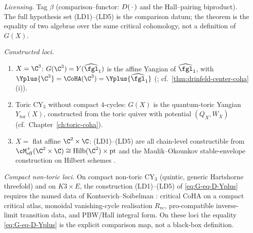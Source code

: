 \begin{theorem}
\emph{Licensing.} Tag $\beta$ \textup{(}comparison--functor:
$D(\,\cdot\,)$ and the Hall--pairing biproduct\textup{)}.
The full hypothesis set \textup{(LD1)--(LD5)} is the comparison datum;
the theorem is the equality of two algebras over the same critical
cohomology, not a definition of $G(X)$.

\emph{Constructed loci.}
\begin{enumerate}[label=\textup{(\roman*)}]
\item $X = \C^3$: $G(\C^3) = Y(\widehat{\fgl}_1)$ is the affine Yangian
of $\widehat{\fgl}_1$, with $\Yplus{\C^3} = \CoHA(\C^3) =
\Yplus{\widehat{\fgl}_1}$
\textup{(}\cite{SchiffmannVasserot2013}; cf.\
\cref{thm:drinfeld-center-coha}\textup{(i)}\textup{)}.
\item Toric CY$_3$ without compact $4$-cycles: $G(X)$ is the
quantum-toric Yangian $Y_{\mathrm{tor}}(X)$, constructed from the toric
quiver with potential $(Q_X, W_X)$
\textup{(}cf.\ Chapter~\ref{ch:toric-coha}\textup{)}.
\item $X = $ flat affine $\C^2 \times \C$: \textup{(LD1)--(LD5)} are
all chain-level constructible from
$\cM^+_{\mathrm{eff}}(\C^2 \times \C) \cong \mathrm{Hilb}(\C^2)
\times \mathrm{pt}$ and the Maulik--Okounkov stable-envelope
construction on Hilbert schemes \cite{MaulikOkounkov2012}.
\end{enumerate}

\emph{Compact non-toric loci.}
On compact non-toric CY$_3$ \textup{(}quintic, generic Hartshorne
threefold\textup{)} and on $K3 \times E$, the construction
\textup{(LD1)--(LD5)} of \cref{eq:G-eq-D-Yplus} requires the named
data of Kontsevich--Soibelman \cite{KontsevichSoibelman2008}: critical
CoHA on a compact critical atlas, monoidal vanishing-cycle realisation
$R_{\mathrm{vc}}$, pro-compatible inverse-limit transition data, and
PBW/Hall integral form. On these loci the equality \cref{eq:G-eq-D-Yplus}
is the explicit comparison map, not a black-box definition.
\end{theorem}

